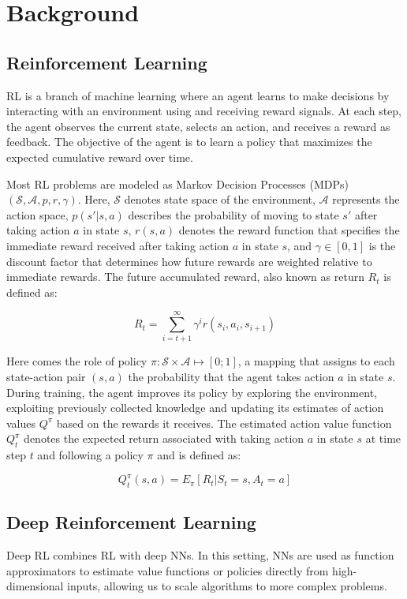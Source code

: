 \cleardoubleoddpage%
\chapter{Background}
\label{sec:Background}


\section{Reinforcement Learning}
RL is a branch of machine learning where an agent learns to make decisions by interacting with an environment using and receiving reward signals. At each step, the agent observes the current state, selects an action, and receives a reward as feedback. The objective of the agent is to learn a policy that maximizes the expected cumulative reward over time.

Most RL problems are modeled as Markov Decision Processes (MDPs) $(\mathcal{S}, \mathcal{A}, p, r, \gamma)$. Here, $\mathcal{S}$ denotes state space of the environment, $\mathcal{A}$ represents the action space, $p(s'|s,a)$ describes the probability of moving to state $s'$ after taking action $a$ in state $s$, $r(s,a)$ denotes the reward function that specifies the immediate reward received after taking action $a$ in state $s$, and $\gamma \in [0,1]$ is the discount factor that determines how future rewards are weighted relative to immediate rewards. The future accumulated reward, also known as return $R_t$ is defined as:

$$R_t = \sum_{i= t+1}^\infty \gamma^i r(s_i, a_i, s_{i+1})$$

Here comes the role of policy $\pi: \mathcal{S} \times \mathcal{A} \mapsto [0;1] $, a mapping that assigns to each state-action pair $(s,a)$ the probability that the agent takes action $a$ in state $s$. During training, the agent improves its policy by exploring the environment, exploiting previously collected knowledge and updating its estimates of action values $Q^\pi$ based on the rewards it receives. The estimated action value function $Q^\pi_t$ denotes the expected return associated with taking action $a$ in state $s$ at time step $t$ and following a policy $\pi$ and is defined as: 

$$ Q^\pi_t(s,a) = E_\pi [R_t | S_t=s, A_t = a] $$




\section{Deep Reinforcement Learning}
Deep RL combines RL with deep NNs. In this setting, NNs are used as function approximators to estimate value functions or policies directly from high-dimensional inputs, allowing us to scale algorithms to more complex problems.

